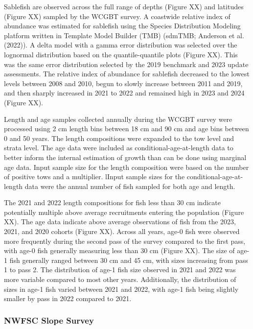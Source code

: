 \documentclass[
]{scrartcl}
\begin{document}
Sablefish are observed across the full range of depths (Figure XX) and
latitudes (Figure XX) sampled by the WCGBT survey. A coastwide relative
index of abundance was estimated for sablefish using the Species
Distribution Modeling platform written in Template Model Builder (TMB)
(sdmTMB; Anderson et al. (2022)). A delta model with a gamma error
distribution was selected over the lognormal distribution based on the
quantile-quantile plots (Figure XX). This was the same error
distribution selected by the 2019 benchmark and 2023 update assessments.
The relative index of abundance for sablefish decreased to the lowest
levels between 2008 and 2010, begun to slowly increase between 2011 and
2019, and then sharply increased in 2021 to 2022 and remained high in
2023 and 2024 (Figure XX).

Length and age samples collected annually during the WCGBT survey were
processed using 2 cm length bins between 18 cm and 90 cm and age bins
between 0 and 50 years. The length compositions were expanded to the tow
level and strata level. The age data were included as
conditional-age-at-length data to better inform the internal estimation
of growth than can be done using marginal age data. Input sample size
for the length composition were based on the number of positive tows and
a multiplier. lInput sample sizes for the conditional-age-at-length data
were the annual number of fish sampled for both age and length.

The 2021 and 2022 length compositions for fish less than 30 cm indicate
potentially multiple above average recruitments entering the population
(Figure XX). The age data indicate above average observations of fish
from the 2023, 2021, and 2020 cohorts (Figure XX). Across all years,
age-0 fish were observed more frequently during the second pass of the
survey compared to the first pass, with age-0 fish generally measuring
less than 30 cm (Figure XX). The size of age-1 fish generally ranged
between 30 cm and 45 cm, with sizes increasing from pass 1 to pass 2.
The distribution of age-1 fish size observed in 2021 and 2022 was more
variable compared to most other years. Additionally, the distribution of
sizes in age-1 fish varied between 2021 and 2022, with age-1 fish being
slightly smaller by pass in 2022 compared to 2021.

\subsubsection{NWFSC Slope Survey}\label{nwfsc-slope-survey}
\end{document}
